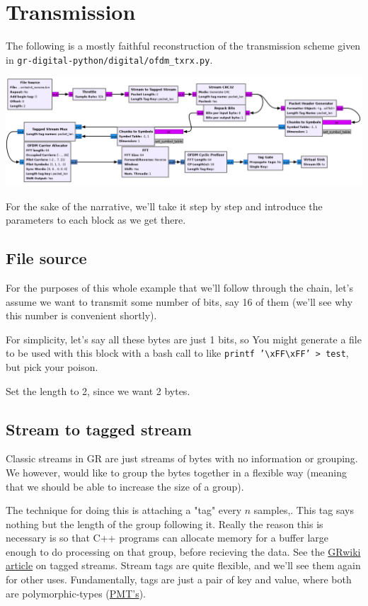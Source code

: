 \documentclass[11pt]{article}
\begin{document}
\section{Transmission}
\label{sec:orgea75003}
The following is a mostly faithful reconstruction of the transmission
scheme given in \texttt{gr-digital-python/digital/ofdm\_txrx.py}.
\begin{center}
\includegraphics[width=\textwidth]{./images/ofdm_tx.png}
\end{center}

For the sake of the narrative, we'll take it step by step and
introduce the parameters to each block as we get there.

\subsection{File source}
\label{sec:orgc15f198}
For the purposes of this whole example that we'll follow through the
chain, let's assume we want to transmit some number of bits, say 16 of
them (we'll see why this number is convenient shortly).

For simplicity, let's say all these bytes are just 1 bits, so
You might generate a file to be used with this block with a bash call
to like \texttt{printf '\textbackslash{}xFF\textbackslash{}xFF' > test}, but pick your poison.

Set the length to 2, since we want 2 bytes.
\subsection{Stream to tagged stream}
\label{sec:org8f46e6f}
Classic streams in GR are just streams of bytes with no information or
grouping. We however, would like to group the bytes together in a
flexible way (meaning that we should be able to increase the size of a
group).

The technique for doing this is attaching a "tag" every \(n\)
samples,. This tag says nothing but the length of the group following
it. Really the reason this is necessary is so that C++ programs can
allocate memory for a buffer large enough to do processing on that
group, before recieving the data. See the \href{https://wiki.gnuradio.org/index.php/Stream\_Tags}{GRwiki article} on tagged
streams. Stream tags are quite flexible, and we'll see them again for
other uses. Fundamentally, tags are just a pair of key and value,
where both are polymorphic-types (\href{https://wiki.gnuradio.org/index.php?title=Polymorphic\_Types\_(PMTs)}{PMT's}).
\end{document}
